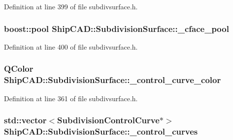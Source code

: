 Definition at line 399 of file subdivsurface.\-h.

\hypertarget{classShipCAD_1_1SubdivisionSurface_a6bb58101a0ee9c4f06e1fdf86f0cded1}{
\subsubsection[{\-\_\-cface\-\_\-pool}]{\setlength{\rightskip}{0pt plus 5cm}boost\-::pool Ship\-C\-A\-D\-::\-Subdivision\-Surface\-::\-\_\-cface\-\_\-pool\hspace{0.3cm}{\ttfamily [protected]}}}\label{classShipCAD_1_1SubdivisionSurface_a6bb58101a0ee9c4f06e1fdf86f0cded1}


Definition at line 400 of file subdivsurface.\-h.

\hypertarget{classShipCAD_1_1SubdivisionSurface_af0385bc183e805c1adc23750747a43d7}{
\subsubsection[{\-\_\-control\-\_\-curve\-\_\-color}]{\setlength{\rightskip}{0pt plus 5cm}Q\-Color Ship\-C\-A\-D\-::\-Subdivision\-Surface\-::\-\_\-control\-\_\-curve\-\_\-color\hspace{0.3cm}{\ttfamily [protected]}}}\label{classShipCAD_1_1SubdivisionSurface_af0385bc183e805c1adc23750747a43d7}


Definition at line 361 of file subdivsurface.\-h.

\hypertarget{classShipCAD_1_1SubdivisionSurface_a72da0f8a60e186e10b88f48950a490e9}{
\subsubsection[{\-\_\-control\-\_\-curves}]{\setlength{\rightskip}{0pt plus 5cm}std\-::vector$<${\bf Subdivision\-Control\-Curve}$\ast$$>$ Ship\-C\-A\-D\-::\-Subdivision\-Surface\-::\-\_\-control\-\_\-curves\hspace{0.3cm}{\ttfamily [protected]}}}\label{classShipCAD_1_1SubdivisionSurface_a72da0f8a60e186e10b88f48950a490e9}



